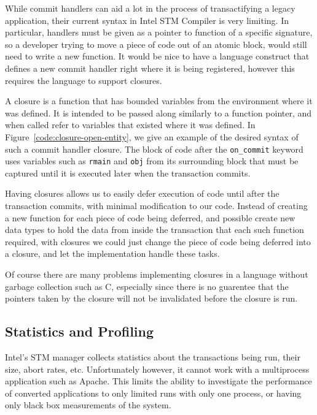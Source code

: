 \documentclass[11pt]{sigplanconf}
\begin{document}
While commit handlers can aid a lot in the process of transactifying a legacy
application, their current syntax in Intel STM Compiler is very limiting.
In particular, handlers must be given as a pointer to function of a specific signature, so a
developer trying to move a piece of code out of an atomic block, would still
need to write a new function. It would be nice to have a language construct that
defines a new commit handler right where it is being registered, however this
requires the language to support closures. 

A closure is a function that has bounded variables from the environment where it
was defined. It is intended to be passed along similarly to a function pointer,
and when called refer to variables that existed where it was defined. In
Figure~\ref{code:closure-open-entity}, we give an example of the desired syntax
of such a commit handler closure. The block of code after the {\tt on_commit}
keyword uses variables such as {\tt rmain} and {\tt obj} from its surrounding
block that must be captured until it is executed later when the transaction
commits.

Having closures allows us to easily defer execution of code until after the
transaction commits, with minimal modification to our code. Instead of creating
a new function for each piece of code being deferred, and possible create new
data types to hold the data from inside the transaction that each such function
required, with closures we could just change the piece of code being deferred
into a closure, and let the implementation handle these tasks.

Of course there are many problems implementing closures in a language without
garbage collection such as C, especially since there is no guarentee that the
pointers taken by the closure will not be invalidated before the closure is run.


\subsection{Statistics and Profiling}\label{sec:wishlist-statistics}
Intel's STM manager collects statistics about the transactions being run, their
size, abort rates, etc. Unfortunately however, it cannot work with a
multiprocess application such as Apache. This limits the ability to investigate
the performance of converted applications to only limited runs with only one
process, or having only black box measurements of the system.
\end{document}
